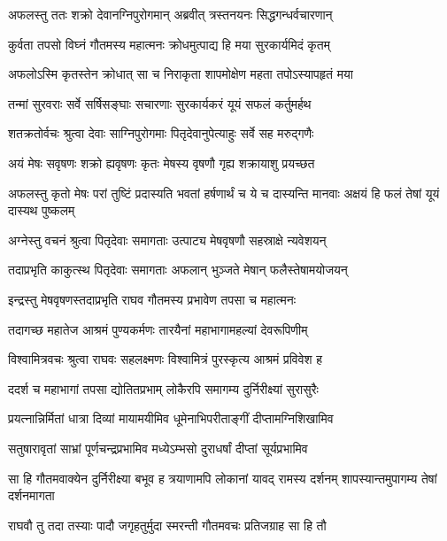 
\twolineshloka
{अफलस्तु ततः शक्रो देवानग्निपुरोगमान्}
{अब्रवीत् त्रस्तनयनः सिद्धगन्धर्वचारणान्} %

\twolineshloka
{कुर्वता तपसो विघ्नं गौतमस्य महात्मनः}
{क्रोधमुत्पाद्य हि मया सुरकार्यमिदं कृतम्} %

\twolineshloka
{अफलोऽस्मि कृतस्तेन क्रोधात् सा च निराकृता}
{शापमोक्षेण महता तपोऽस्यापहृतं मया} %

\twolineshloka
{तन्मां सुरवराः सर्वे सर्षिसङ्घाः सचारणाः}
{सुरकार्यकरं यूयं सफलं कर्तुमर्हथ} %

\twolineshloka
{शतक्रतोर्वचः श्रुत्वा देवाः साग्निपुरोगमाः}
{पितृदेवानुपेत्याहुः सर्वे सह मरुद्गणैः} %

\twolineshloka
{अयं मेषः सवृषणः शक्रो ह्यवृषणः कृतः}
{मेषस्य वृषणौ गृह्य शक्रायाशु प्रयच्छत} %

\threelineshloka
{अफलस्तु कृतो मेषः परां तुष्टिं प्रदास्यति}
{भवतां हर्षणार्थं च ये च दास्यन्ति मानवाः}
{अक्षयं हि फलं तेषां यूयं दास्यथ पुष्कलम्} %

\twolineshloka
{अग्नेस्तु वचनं श्रुत्वा पितृदेवाः समागताः}
{उत्पाट्य मेषवृषणौ सहस्राक्षे न्यवेशयन्} %

\twolineshloka
{तदाप्रभृति काकुत्स्थ पितृदेवाः समागताः}
{अफलान् भुञ्जते मेषान् फलैस्तेषामयोजयन्} %

\twolineshloka
{इन्द्रस्तु मेषवृषणस्तदाप्रभृति राघव}
{गौतमस्य प्रभावेण तपसा च महात्मनः} %

\twolineshloka
{तदागच्छ महातेज आश्रमं पुण्यकर्मणः}
{तारयैनां महाभागामहल्यां देवरूपिणीम्} %

\twolineshloka
{विश्वामित्रवचः श्रुत्वा राघवः सहलक्ष्मणः}
{विश्वामित्रं पुरस्कृत्य आश्रमं प्रविवेश ह} %

\twolineshloka
{ददर्श च महाभागां तपसा द्योतितप्रभाम्}
{लोकैरपि समागम्य दुर्निरीक्ष्यां सुरासुरैः} %

\twolineshloka
{प्रयत्नान्निर्मितां धात्रा दिव्यां मायामयीमिव}
{धूमेनाभिपरीताङ्गीं दीप्तामग्निशिखामिव} %

\twolineshloka
{सतुषारावृतां साभ्रां पूर्णचन्द्रप्रभामिव}
{मध्येऽम्भसो दुराधर्षां दीप्तां सूर्यप्रभामिव} %

\threelineshloka
{सा हि गौतमवाक्येन दुर्निरीक्ष्या बभूव ह}
{त्रयाणामपि लोकानां यावद् रामस्य दर्शनम्}
{शापस्यान्तमुपागम्य तेषां दर्शनमागता} %

\twolineshloka
{राघवौ तु तदा तस्याः पादौ जगृहतुर्मुदा}
{स्मरन्ती गौतमवचः प्रतिजग्राह सा हि तौ} %

